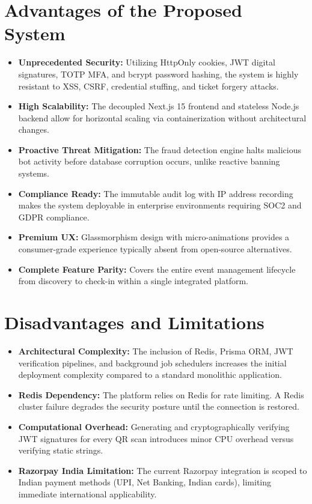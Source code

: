 \documentclass[12pt,a4paper]{report}
\begin{document}
\section{Advantages of the Proposed System}
\begin{itemize}[leftmargin=2em]
    \item \textbf{Unprecedented Security:} Utilizing HttpOnly cookies, JWT digital signatures, TOTP MFA, and bcrypt password hashing, the system is highly resistant to XSS, CSRF, credential stuffing, and ticket forgery attacks.
    \item \textbf{High Scalability:} The decoupled Next.js 15 frontend and stateless Node.js backend allow for horizontal scaling via containerization without architectural changes.
    \item \textbf{Proactive Threat Mitigation:} The fraud detection engine halts malicious bot activity before database corruption occurs, unlike reactive banning systems.
    \item \textbf{Compliance Ready:} The immutable audit log with IP address recording makes the system deployable in enterprise environments requiring SOC2 and GDPR compliance.
    \item \textbf{Premium UX:} Glassmorphism design with micro-animations provides a consumer-grade experience typically absent from open-source alternatives.
    \item \textbf{Complete Feature Parity:} Covers the entire event management lifecycle from discovery to check-in within a single integrated platform.
\end{itemize}

\section{Disadvantages and Limitations}
\begin{itemize}[leftmargin=2em]
    \item \textbf{Architectural Complexity:} The inclusion of Redis, Prisma ORM, JWT verification pipelines, and background job schedulers increases the initial deployment complexity compared to a standard monolithic application.
    \item \textbf{Redis Dependency:} The platform relies on Redis for rate limiting. A Redis cluster failure degrades the security posture until the connection is restored.
    \item \textbf{Computational Overhead:} Generating and cryptographically verifying JWT signatures for every QR scan introduces minor CPU overhead versus verifying static strings.
    \item \textbf{Razorpay India Limitation:} The current Razorpay integration is scoped to Indian payment methods (UPI, Net Banking, Indian cards), limiting immediate international applicability.
\end{itemize}
\end{document}
